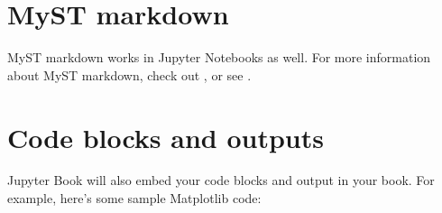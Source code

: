 \documentclass[letterpaper,10pt,english]{jupyterBook}
\begin{document}
\section{MyST markdown}
\label{\detokenize{notebooks:myst-markdown}}
\sphinxAtStartPar
MyST markdown works in Jupyter Notebooks as well. For more information about MyST markdown, check
out ,
or see .


\section{Code blocks and outputs}
\label{\detokenize{notebooks:code-blocks-and-outputs}}
\sphinxAtStartPar
Jupyter Book will also embed your code blocks and output in your book.
For example, here’s some sample Matplotlib code:
\end{document}
